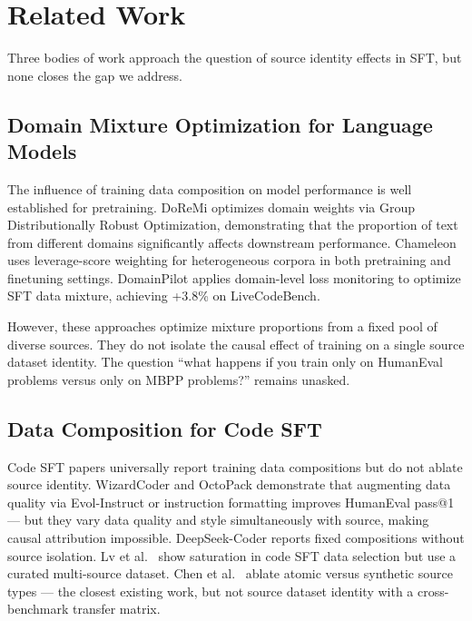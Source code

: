 \section{Related Work}
\label{sec:related}

Three bodies of work approach the question of source identity effects in SFT, but none closes
the gap we address.

\subsection{Domain Mixture Optimization for Language Models}

The influence of training data composition on model performance is well established for
pretraining. DoReMi \cite{Xie2023DoReMi} optimizes domain weights via Group Distributionally
Robust Optimization, demonstrating that the proportion of text from different domains
significantly affects downstream performance. Chameleon \cite{Xie2025Chameleon} uses leverage-score
weighting for heterogeneous corpora in both pretraining and finetuning settings. DomainPilot
\cite{Zhang2026DomainPilot} applies domain-level loss monitoring to optimize SFT data mixture, achieving
+3.8\% on LiveCodeBench.

However, these approaches optimize mixture proportions from a fixed pool of diverse sources.
They do not isolate the causal effect of training on a single source dataset identity. The
question ``what happens if you train only on HumanEval problems versus only on MBPP problems?''
remains unasked.

\subsection{Data Composition for Code SFT}

Code SFT papers universally report training data compositions but do not ablate source
identity. WizardCoder \cite{Luo2023WizardCoder} and OctoPack \cite{Muennighoff2023OctoPack} demonstrate
that augmenting data quality via Evol-Instruct or instruction formatting improves HumanEval
pass@1 --- but they vary data quality and style simultaneously with source, making causal
attribution impossible. DeepSeek-Coder \cite{Guo2024DeepSeekCoder} reports fixed compositions without
source isolation. Lv et al.\ \cite{Lv2025DataEfficient} show saturation in code SFT data selection but use a
curated multi-source dataset. Chen et al.\ \cite{Chen2024UnlockSFT} ablate atomic versus synthetic source types ---
the closest existing work, but not source dataset identity with a cross-benchmark transfer
matrix.

